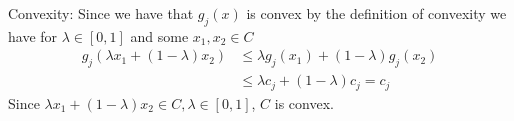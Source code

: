 \documentclass[12pt]{report}
\begin{document}
Convexity: Since we have that $g_j(x)$ is convex by the definition of convexity we have for
$\lambda \in [0,1] $ and some $x_1,x_2\in C$
\begin{align*}
g_j(\lambda x_1+ (1-\lambda)x_2) &\leq \lambda g_j(x_1) + (1-\lambda) g_j(x_2) \\
& \leq \lambda c_j + (1-\lambda) c_j = c_j 
\end{align*}
Since $\lambda x_1+ (1-\lambda)x_2 \in C, \lambda \in [0,1] $, $C$ is convex.
\end{document}
